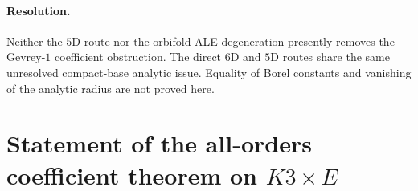 \documentclass[11pt]{article}
\theoremstyle{definition}\newtheorem{definition}[theorem]{Definition}
\theoremstyle{remark}\newtheorem{remark}[theorem]{Remark}\newtheorem{example}[theorem]{Example}
\begin{document}
\paragraph{Resolution.}
Neither the $5$D route nor the orbifold-ALE degeneration presently
removes the Gevrey-$1$ coefficient obstruction. The direct $6$D and
$5$D routes share the same unresolved compact-base analytic issue.
Equality of Borel constants and vanishing of the analytic radius are
not proved here.

\section{Statement of the all-orders coefficient theorem on $K3\times E$}
\end{document}
